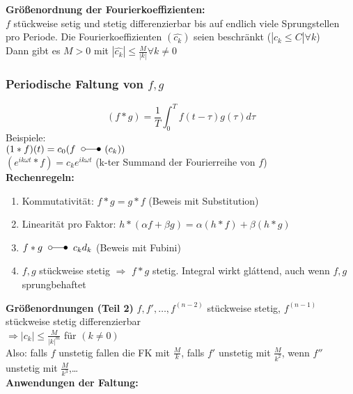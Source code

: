 \documentclass[nocolor,german]{latex4ei/latex4ei_sheet}
\DeclareMathOperator{\T}{\overset{\scriptscriptstyle\mathcal{}}{\ftsymbol}}						%
\begin{document}
	\textbf{Gr\"o\ss{}enordnung der Fourierkoeffizienten:}\\
	$f$ st\"uckweise setig und stetig differenzierbar bis auf endlich viele Sprungstellen pro Periode. Die Fourierkoeffizienten $(\hat{c_k})$ seien beschr\"ankt ($|\hat{c_k}\le C| \forall k$)\\
	Dann gibt es $M > 0$ mit $|\hat{c_k}| \le \frac{M}{|k|} \forall k \neq 0$

	\subsubsection{Periodische Faltung von $f,g$}
	\[(f \ast g)=\frac{1}{T}\int_0^T f(t-\tau)g(\tau)d \tau\] 
	Beispiele:\\
	$(1 \ast f)(t)=c_0 (f \T (c_k))$\\
	$(e^{i k \omega t} \ast f)=c_k e^{i k \omega t}$ (k-ter Summand der Fourierreihe von $f$)\\
	\textbf{Rechenregeln:}
	\begin{enumerate}
		\item Kommutativit\"at: $f \ast g=g \ast f$ (Beweis mit Substitution)
		\item Linearit\"at pro Faktor: $h \ast (\alpha f + \beta g)=\alpha (h \ast f)+\beta (h \ast g)$
		\item $f \ast g \T c_k d_k$ (Beweis mit Fubini)
		\item $f,g$ st\"uckweise stetig $\Rightarrow$ $f\ast g$ stetig. Integral wirkt gl\'attend, auch wenn $f,g$ sprungbehaftet
	\end{enumerate}
	\textbf{Gr\"o\ss{}enordnungen (Teil 2)}
	$f,f',\ldots,f^{(n-2)}$ st\"uckweise stetig, $f^{(n-1)}$ st\"uckweise stetig differenzierbar\\
	$\Rightarrow |c_k| \le \frac{M}{|k|^m}$ f\"ur $(k \neq 0)$\\
	Also: falls $f$ unstetig fallen die FK mit $\frac{M}{k}$, falls $f'$ unstetig mit $\frac{M}{k^2}$, wenn $f''$ unstetig mit $\frac{M}{k^3}$,\ldots\\
	\textbf{Anwendungen der Faltung:}
\end{document}
